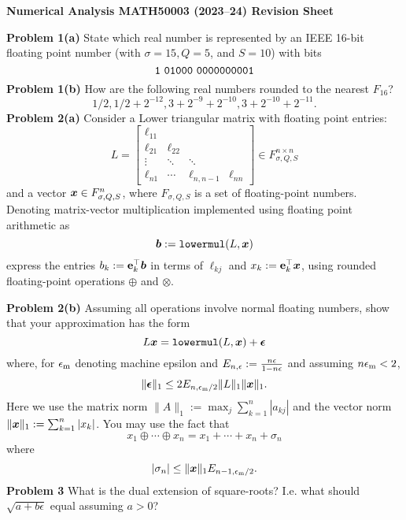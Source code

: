 \documentclass[12pt,a4paper]{article}
\def\endash{–}
\def\x{ {\vc x} }
\def\b{ {\vc b} }
\begin{document}
\textbf{Numerical Analysis MATH50003 (2023\ensuremath{\endash}24) Revision Sheet}

\textbf{Problem 1(a)} State which real number is represented by an IEEE 16-bit floating point number (with $\ensuremath{\sigma} = 15, Q = 5$, and $S = 10$) with bits
\[
{\tt 1\ 01000\ 0000000001}
\]
\textbf{Problem 1(b)}  How are the following real numbers rounded to the nearest $F_{16}$?
\[
1/2, 1/2 + 2^{-12}, 3 + 2^{-9} + 2^{-10}, 3 + 2^{-10} + 2^{-11}.
\]
\textbf{Problem 2(a)} Consider a Lower triangular matrix with floating point entries:
\[
L = \begin{bmatrix}
\ensuremath{\ell}_{11} \\
 \ensuremath{\ell}_{21} & \ensuremath{\ell}_{22} \\
 \ensuremath{\vdots} & \ensuremath{\ddots} & \ensuremath{\ddots} \\
 \ensuremath{\ell}_{n1} & \ensuremath{\cdots} & \ensuremath{\ell}_{n,n-1} & \ensuremath{\ell}_{nn}
 \end{bmatrix} \ensuremath{\in} F_{\ensuremath{\sigma},Q,S}^{n \ensuremath{\times} n}
\]
and a vector $\ensuremath{\bm{\x}} \in F_{\ensuremath{\sigma},Q,S}^{n}$, where $F_{\ensuremath{\sigma},Q,S}$ is a set of floating-point numbers. Denoting matrix-vector multiplication implemented using floating point arithmetic as
\[
\ensuremath{\bm{\b}} := {\tt lowermul}(L,\ensuremath{\bm{\x}})
\]
express the entries $b_k := {\bf e}_k^\ensuremath{\top} \ensuremath{\bm{\b}}$  in terms of $\ensuremath{\ell}_{kj}$ and $x_k := {\bf e}_k^\ensuremath{\top} \ensuremath{\bm{\x}}$,  using rounded floating-point operations $\ensuremath{\oplus}$ and $\ensuremath{\otimes}$.

\textbf{Problem 2(b)} Assuming all operations involve normal floating numbers, show that your approximation has the form
\[
L \ensuremath{\bm{\x}} = {\tt lowermul}(L, \ensuremath{\bm{\x}}) + \ensuremath{\bm{\epsilon}}
\]
where, for $\ensuremath{\epsilon}_{\rm m}$ denoting machine epsilon and $E_{n,\ensuremath{\epsilon}}:= {n \ensuremath{\epsilon} \over 1-n\ensuremath{\epsilon}}$ and assuming $n \ensuremath{\epsilon}_{\rm m} < 2$,
\[
\| \ensuremath{\bm{\epsilon}} \|_1 \ensuremath{\leq}   2E_{n,\ensuremath{\epsilon}_{\rm m}/2}   \|L\|_1 \| \ensuremath{\bm{\x}} \|_1.
\]
Here we use  the matrix norm $\| A \|_1 := \max_j \ensuremath{\sum}_{k=1}^n |a_{kj}|$ and the vector norm $\| \ensuremath{\bm{\x}} \|_1 := \ensuremath{\sum}_{k=1}^n |x_k|$. You may use the fact that
\[
x_1 \ensuremath{\oplus} \ensuremath{\cdots} \ensuremath{\oplus} x_n = x_1 +  \ensuremath{\cdots} + x_n + \ensuremath{\sigma}_n
\]
where
\[
|\ensuremath{\sigma}_n| \ensuremath{\leq} \| \ensuremath{\bm{\x}} \|_1 E_{n-1,\ensuremath{\epsilon}_{\rm m}/2}.
\]
\textbf{Problem 3} What is the dual extension of square-roots? I.e. what should $\sqrt{a + b \ensuremath{\epsilon}}$ equal assuming $a > 0$?
\end{document}
